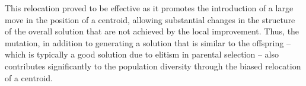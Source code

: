 This relocation proved to be effective as it promotes the introduction of a large move in the position of a centroid, allowing substantial changes in the structure of the overall solution that are not achieved by the local improvement. Thus, the mutation, in addition to generating a solution that is similar to the offspring -- which is typically a good solution due to elitism in parental selection -- also contributes significantly to the population diversity through the biased relocation of a centroid.


